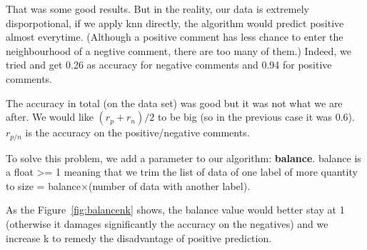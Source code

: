 \documentclass{article}
\begin{document}
That was some good results. But in the reality, our data is extremely disporpotional,
if we apply knn directly, the algorithm would predict positive almost everytime. (Although
a positive comment has less chance to enter the neighbourhood of a negtive comment,
there are too many of them.) Indeed, we tried and get 0.26 as accuracy for negative comments and 0.94 for
positive comments.

The accuracy in total (on the data set) was good but it was not what we are after. We would like
$(r_p+r_n)/2$ to be big (so in the previous case it was 0.6). $r_{p/n}$ is the accuracy on the positive/negative comments.

To solve this problem, we add a parameter to our algorithm: \textbf{balance}.
balance is a float >= 1 meaning that we trim the list of data of one label
of more quantity to size = balance$\times$(number of data with another label).

As the Figure~\ref{fig:balancenk} shows, the balance value would
better stay at 1 (otherwise it damages significantly
the accuracy on the negatives) and we increase k to
remedy the disadvantage of positive prediction.
\end{document}
